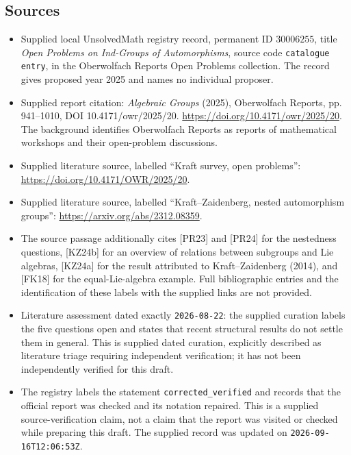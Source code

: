 \documentclass[11pt]{article}
\begin{document}
\subsection{Sources}
\begin{itemize}
\item Supplied local UnsolvedMath registry record, permanent ID \(30006255\), title \emph{Open Problems on Ind-Groups of Automorphisms}, source code \texttt{catalogue entry}, in the Oberwolfach Reports Open Problems collection. The record gives proposed year 2025 and names no individual proposer.
\item Supplied report citation: \emph{Algebraic Groups} (2025), Oberwolfach Reports, pp. 941--1010, DOI 10.4171/owr/2025/20. \url{https://doi.org/10.4171/owr/2025/20}. The background identifies Oberwolfach Reports as reports of mathematical workshops and their open-problem discussions.
\item Supplied literature source, labelled ``Kraft survey, open problems'': \url{https://doi.org/10.4171/OWR/2025/20}.
\item Supplied literature source, labelled ``Kraft--Zaidenberg, nested automorphism groups'': \url{https://arxiv.org/abs/2312.08359}.
\item The source passage additionally cites [PR23] and [PR24] for the nestedness questions, [KZ24b] for an overview of relations between subgroups and Lie algebras, [KZ24a] for the result attributed to Kraft--Zaidenberg (2014), and [FK18] for the equal-Lie-algebra example. Full bibliographic entries and the identification of these labels with the supplied links are not provided.
\item Literature assessment dated exactly \texttt{2026-08-22}: the supplied curation labels the five questions open and states that recent structural results do not settle them in general. This is supplied dated curation, explicitly described as literature triage requiring independent verification; it has not been independently verified for this draft.
\item The registry labels the statement \texttt{corrected\_verified} and records that the official report was checked and its notation repaired. This is a supplied source-verification claim, not a claim that the report was visited or checked while preparing this draft. The supplied record was updated on \texttt{2026-09-16T12:06:53Z}.
\end{itemize}
\end{document}
